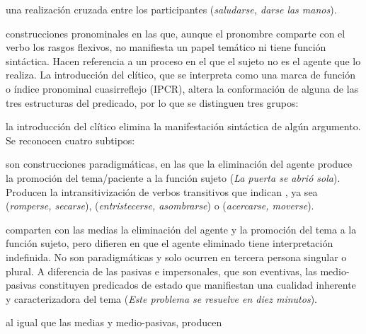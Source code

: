 \begin{glosariogeneral}
\begin{glosario}
\begin{glosario}
                una realización cruzada entre los participantes
                (\textit{saludarse, darse las manos}).
        \end{glosario}
      \item[cuasirreflejas:] construcciones pronominales en las que, aunque el
            pronombre comparte con el verbo los rasgos flexivos, no manifiesta
            un papel temático ni tiene función sintáctica. Hacen referencia a un
            proceso en el que el sujeto no es el agente que lo realiza. La
            introducción del clítico, que se interpreta como una marca de
            función o índice pronominal cuasirreflejo (IPCR), altera la
            conformación de alguna de las tres estructuras del predicado, por lo
            que se distinguen tres grupos:
        \begin{glosario}
          \item[de cambio en la estructura argumental:] la introducción del
                clítico elimina la manifestación sintáctica de algún argumento.
                Se reconocen cuatro subtipos:
            \begin{glosario}
              \item[medias:] son construcciones paradigmáticas, en las que la
                    eliminación del agente produce la promoción del
                    tema/paciente a la función sujeto (\textit{La puerta se abrió
                    sola}). Producen la intransitivización de verbos transitivos
                    que indican , ya sea 
                    (\textit{romperse, secarse}), 
                    (\textit{entristecerse, asombrarse}) o  (\textit{acercarse, moverse}).
              \item[medio-pasivas:] comparten con las medias la eliminación del
                    agente y la promoción del tema a la función sujeto, pero
                    difieren en que el agente eliminado tiene interpretación
                    indefinida. No son paradigmáticas y solo ocurren en tercera
                    persona singular o plural. A diferencia de las pasivas e
                    impersonales, que son eventivas, las medio-pasivas
                    constituyen predicados de estado que manifiestan una
                    cualidad inherente y caracterizadora del tema (\textit{Este
                    problema se resuelve en diez minutos}).
              \item[pasivas:] al igual que las medias y medio-pasivas, producen

\end{glosario}
\end{glosario}
\end{glosario}
\end{glosariogeneral}
